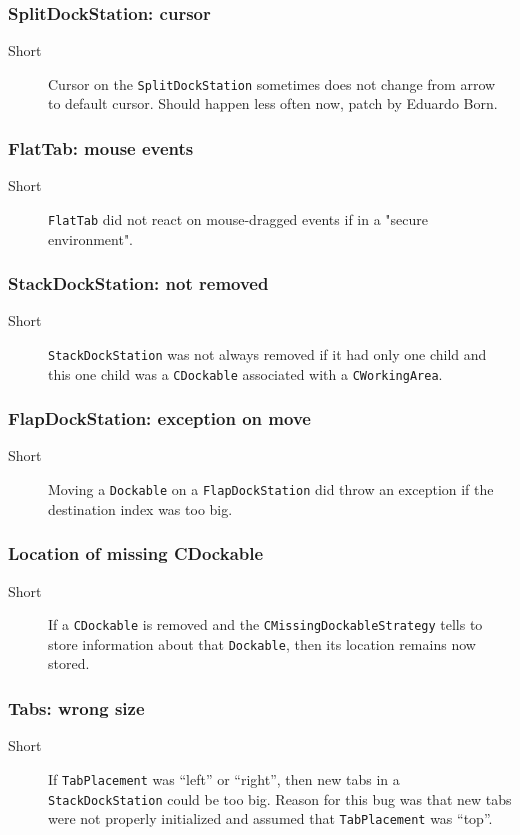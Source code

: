 \documentclass[a4paper,10pt]{article}
\newcommand{\src}[1]{\lstinline[basicstyle=\normalsize\ttfamily,keywordstyle=\normalsize\ttfamily,identifierstyle=\normalsize\ttfamily]|#1|}
\newcommand{\short}{\item[Short]}
\begin{document}
\subsubsection{SplitDockStation: cursor}
\begin{description}
 \short Cursor on the \src{SplitDockStation} sometimes does not change from arrow to default cursor. Should happen less often now, patch by Eduardo Born.
\end{description}

\subsubsection{FlatTab: mouse events}
\begin{description}
 \short \src{FlatTab} did not react on mouse-dragged events if in a "secure environment".
\end{description}

\subsubsection{StackDockStation: not removed}
\begin{description}
 \short \src{StackDockStation} was not always removed if it had only one child and this one child was a \src{CDockable} associated with a \src{CWorkingArea}.
\end{description}

\subsubsection{FlapDockStation: exception on move}
\begin{description}
 \short Moving a \src{Dockable} on a \src{FlapDockStation} did throw an exception if the destination index was too big.
\end{description}

\subsubsection{Location of missing CDockable}
\begin{description}
 \short If a \src{CDockable} is removed and the \src{CMissingDockableStrategy} tells to store information about that \src{Dockable}, then its location remains now stored.
\end{description}

\subsubsection{Tabs: wrong size}
\begin{description}
 \short If \src{TabPlacement} was ``left'' or ``right'', then new tabs in a \src{StackDockStation} could be too big. Reason for this bug was that new tabs were not properly initialized and assumed that \src{TabPlacement} was ``top''.
\end{description}
\end{document}
